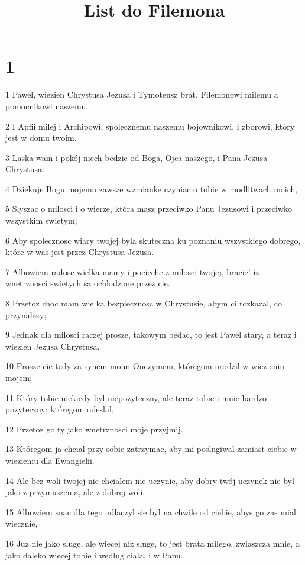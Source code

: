 

\title{List do Filemona}


\chapter{1}

\par 1 Pawel, wiezien Chrystusa Jezusa i Tymoteusz brat, Filemonowi milemu a pomocnikowi naszemu,
\par 2 I Apfii milej i Archipowi, spolecznemu naszemu bojownikowi, i zborowi, który jest w domu twoim.
\par 3 Laska wam i pokój niech bedzie od Boga, Ojca naszego, i Pana Jezusa Chrystusa.
\par 4 Dziekuje Bogu mojemu zawsze wzmianke czyniac o tobie w modlitwach moich,
\par 5 Slyszac o milosci i o wierze, która masz przeciwko Panu Jezusowi i przeciwko wszystkim swietym;
\par 6 Aby spolecznosc wiary twojej byla skuteczna ku poznaniu wszystkiego dobrego, które w was jest przez Chrystusa Jezusa.
\par 7 Albowiem radosc wielka mamy i pocieche z milosci twojej, bracie! iz wnetrznosci swietych sa ochlodzone przez cie.
\par 8 Przetoz choc mam wielka bezpiecznosc w Chrystusie, abym ci rozkazal, co przynalezy;
\par 9 Jednak dla milosci raczej prosze, takowym bedac, to jest Pawel stary, a teraz i wiezien Jezusa Chrystusa.
\par 10 Prosze cie tedy za synem moim Onezymem, któregom urodzil w wiezieniu mojem;
\par 11 Który tobie niekiedy byl niepozyteczny, ale teraz tobie i mnie bardzo pozyteczny; któregom odeslal,
\par 12 Przetoz go ty jako wnetrznosci moje przyjmij.
\par 13 Któregom ja chcial przy sobie zatrzymac, aby mi poslugiwal zamiast ciebie w wiezieniu dla Ewangielii.
\par 14 Ale bez woli twojej nie chcialem nic uczynic, aby dobry twój uczynek nie byl jako z przymuszenia, ale z dobrej woli.
\par 15 Albowiem snac dla tego odlaczyl sie byl na chwile od ciebie, abys go zas mial wiecznie,
\par 16 Juz nie jako sluge, ale wiecej niz sluge, to jest brata milego, zwlaszcza mnie, a jako daleko wiecej tobie i wedlug ciala, i w Panu.
